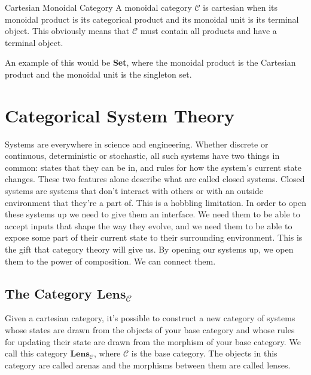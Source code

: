 \documentclass[12pt]{article}
\newcounter{examp}
\begin{document}
\begin{definition}{Cartesian Monoidal Category}{}
    A monoidal category $\mathcal{C}$ is cartesian when its monoidal product is its categorical product and its monoidal unit is its terminal object.
    This obviously means that $\mathcal{C}$ must contain all products and have a terminal object.
\end{definition}
An example of this would be \textbf{Set}, where the monoidal product is the Cartesian product and the monoidal unit is the singleton set.






\section*{Categorical System Theory}
Systems are everywhere in science and engineering.
Whether discrete or continuous, deterministic or stochastic, all such systems have two things in common: states that they can be in, and rules for how the system's current state changes.
These two features alone describe what are called closed systems.
Closed systems are systems that don't interact with others or with an outside environment that they're a part of.
This is a hobbling limitation.
In order to open these systems up we need to give them an interface.
We need them to be able to accept inputs that shape the way they evolve, and we need them to be able to expose some part of their current state to their surrounding environment.
This is the gift that category theory will give us.
By opening our systems up, we open them to the power of composition.
We can connect them.




\subsection*{The Category $\textbf{Lens}_{\mathcal{C}}$}
Given a cartesian category, it's possible to construct a new category of systems whose states are drawn from the objects of your base category and whose rules for updating their state are drawn from the morphism of your base category.
We call this category $\textbf{Lens}_{\mathcal{C}}$, where $\mathcal{C}$ is the base category.
The objects in this category are called arenas and the morphisms between them are called lenses.
\end{document}
